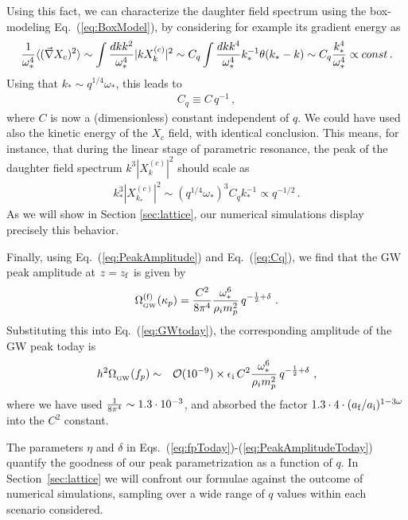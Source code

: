 \documentclass[a4paper,11pt]{article}
\begin{document}
Using this fact, we can characterize the daughter field spectrum using the box-modeling Eq.~(\ref{eq:BoxModel}), by considering for example its gradient energy as
\begin{eqnarray}
{1\over\omega_*^4}\langle (\vec\nabla X_{c})^2\rangle \sim \int {dk k^2\over\omega_*^4} |k X^{(c)}_k|^2 \sim C_q\int {dk k^4\over\omega_*^4} k_*^{-1}\theta(k_*-k) \sim C_q {k_*^4\over\omega_*^4} \propto const\,.
\end{eqnarray}
Using that $k_* \sim q^{1/4}\omega_*$, this leads to
\begin{eqnarray}\label{eq:Cq}
C_q \equiv C \,q^{-1}\,,
\end{eqnarray}
where $C$ is now a (dimensionless) constant independent of $q$. We could have used also the kinetic energy of the $X_c$ field, with identical conclusion. This means, for instance, that during the linear stage of parametric resonance, the peak of the daughter field spectrum $k^3|X^{(c)}_k|^2$ should scale as
\begin{eqnarray}\label{eq:PeakMatterField}
k_*^3|X^{(c)}_{k_*}|^2 \sim (q^{1/4}\omega_*)^3C_qk_*^{-1} \propto q^{-1/2}\,.
\end{eqnarray}
As we will show in Section \ref{sec:lattice}, our numerical simulations display precisely this behavior.

Finally, using Eq.~(\ref{eq:PeakAmplitude}) and Eq.~(\ref{eq:Cq}), we find that the GW peak amplitude at $z= z_{\rm f}$ is given by
\begin{eqnarray}\label{eq:PeakAmplitudeV2}
\Omega_{_{\rm GW}}^{({\rm f})}(\kappa_p) = {C^2\over 8\pi^4}\frac{\omega_*^{6}}{\rho_i m_{p}^{2}}\,q^{-\frac{1}{2}+\delta}\ .
\end{eqnarray}
Substituting this into Eq.~(\ref{eq:GWtoday}), the corresponding amplitude of the GW peak today is
\begin{eqnarray}\label{eq:PeakAmplitudeToday}
h^{2}\Omega_{_{\rm GW}} (f_p) &\sim& \mathcal{O} (10^{-9} ) \times \epsilon_{\rm i}\,C^{2}\frac{\omega_*^{6}}{\rho_i m_{p}^{2}}\,q^{-\frac{1}{2}+\delta}\ ,
\end{eqnarray}
where we have used ${1\over 8\pi^4} \sim 1.3\cdot 10^{-3}$, and absorbed the factor $1.3\cdot4\cdot(a_{\rm f}/a_{\rm i})^{1 -3 \omega}$ into the $C^2$ constant. 

The parameters $\eta$ and $\delta$ in Eqs.~(\ref{eq:fpToday})-(\ref{eq:PeakAmplitudeToday}) quantify the goodness of our peak parametrization as a function of $q$. In Section~\ref{sec:lattice} we will confront our formulae against the outcome of numerical simulations, sampling over a wide range of $q$ values within each scenario considered. 
\end{document}
